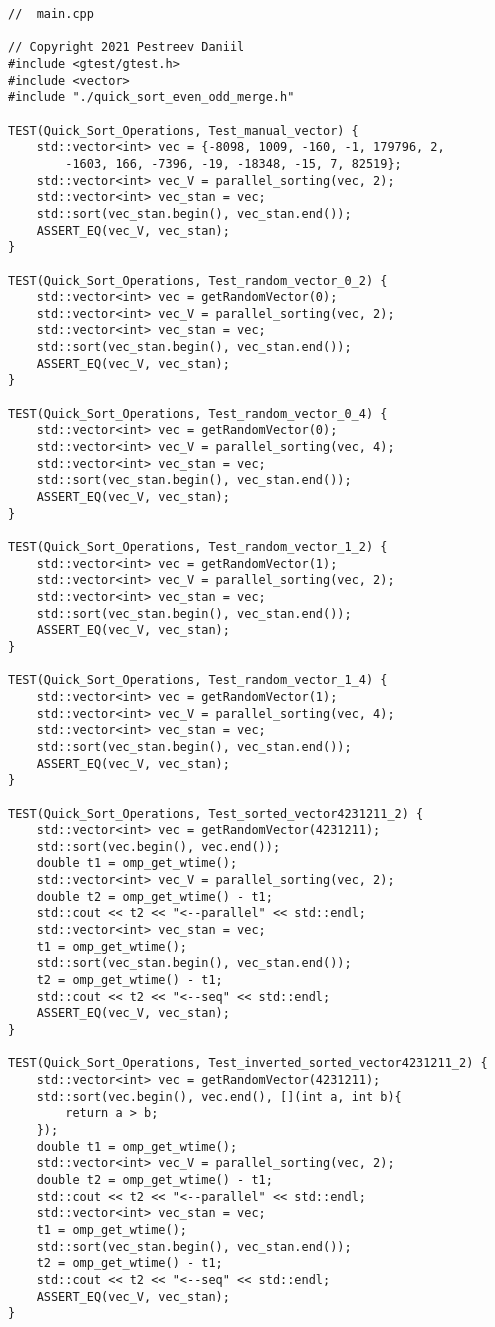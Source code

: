 \documentclass{report}
\begin{document}
\begin{lstlisting}
//  main.cpp

// Copyright 2021 Pestreev Daniil
#include <gtest/gtest.h>
#include <vector>
#include "./quick_sort_even_odd_merge.h"

TEST(Quick_Sort_Operations, Test_manual_vector) {
    std::vector<int> vec = {-8098, 1009, -160, -1, 179796, 2,
        -1603, 166, -7396, -19, -18348, -15, 7, 82519};
    std::vector<int> vec_V = parallel_sorting(vec, 2);
    std::vector<int> vec_stan = vec;
    std::sort(vec_stan.begin(), vec_stan.end());
    ASSERT_EQ(vec_V, vec_stan);
}

TEST(Quick_Sort_Operations, Test_random_vector_0_2) {
    std::vector<int> vec = getRandomVector(0);
    std::vector<int> vec_V = parallel_sorting(vec, 2);
    std::vector<int> vec_stan = vec;
    std::sort(vec_stan.begin(), vec_stan.end());
    ASSERT_EQ(vec_V, vec_stan);
}

TEST(Quick_Sort_Operations, Test_random_vector_0_4) {
    std::vector<int> vec = getRandomVector(0);
    std::vector<int> vec_V = parallel_sorting(vec, 4);
    std::vector<int> vec_stan = vec;
    std::sort(vec_stan.begin(), vec_stan.end());
    ASSERT_EQ(vec_V, vec_stan);
}

TEST(Quick_Sort_Operations, Test_random_vector_1_2) {
    std::vector<int> vec = getRandomVector(1);
    std::vector<int> vec_V = parallel_sorting(vec, 2);
    std::vector<int> vec_stan = vec;
    std::sort(vec_stan.begin(), vec_stan.end());
    ASSERT_EQ(vec_V, vec_stan);
}

TEST(Quick_Sort_Operations, Test_random_vector_1_4) {
    std::vector<int> vec = getRandomVector(1);
    std::vector<int> vec_V = parallel_sorting(vec, 4);
    std::vector<int> vec_stan = vec;
    std::sort(vec_stan.begin(), vec_stan.end());
    ASSERT_EQ(vec_V, vec_stan);
}

TEST(Quick_Sort_Operations, Test_sorted_vector4231211_2) {
    std::vector<int> vec = getRandomVector(4231211);
    std::sort(vec.begin(), vec.end());
    double t1 = omp_get_wtime();
    std::vector<int> vec_V = parallel_sorting(vec, 2);
    double t2 = omp_get_wtime() - t1;
    std::cout << t2 << "<--parallel" << std::endl;
    std::vector<int> vec_stan = vec;
    t1 = omp_get_wtime();
    std::sort(vec_stan.begin(), vec_stan.end());
    t2 = omp_get_wtime() - t1;
    std::cout << t2 << "<--seq" << std::endl;
    ASSERT_EQ(vec_V, vec_stan);
}

TEST(Quick_Sort_Operations, Test_inverted_sorted_vector4231211_2) {
    std::vector<int> vec = getRandomVector(4231211);
    std::sort(vec.begin(), vec.end(), [](int a, int b){
        return a > b;
    });
    double t1 = omp_get_wtime();
    std::vector<int> vec_V = parallel_sorting(vec, 2);
    double t2 = omp_get_wtime() - t1;
    std::cout << t2 << "<--parallel" << std::endl;
    std::vector<int> vec_stan = vec;
    t1 = omp_get_wtime();
    std::sort(vec_stan.begin(), vec_stan.end());
    t2 = omp_get_wtime() - t1;
    std::cout << t2 << "<--seq" << std::endl;
    ASSERT_EQ(vec_V, vec_stan);
}


\end{lstlisting}
\end{document}
